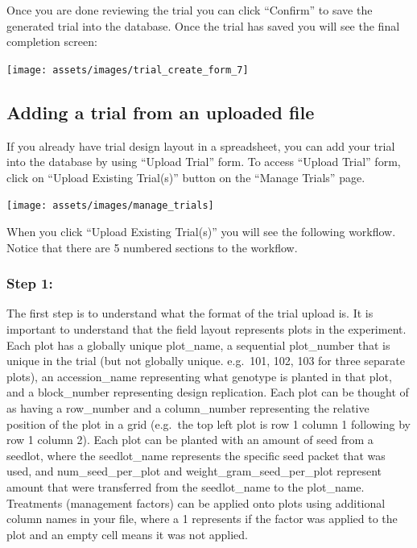 \documentclass[
  12pt,
]{book}
\begin{document}
Once you are done reviewing the trial you can click ``Confirm'' to save the generated trial into the database. Once the trial has saved you will see the final completion screen:

\begin{center}\texttt{[image: assets/images/trial\_create\_form\_7]} \end{center}

\hypertarget{adding-a-trial-from-an-uploaded-file}{%
\subsection{Adding a trial from an uploaded file}\label{adding-a-trial-from-an-uploaded-file}}

If you already have trial design layout in a spreadsheet, you can add your trial into the database by using ``Upload Trial'' form. To access ``Upload Trial'' form, click on ``Upload Existing Trial(s)'' button on the ``Manage Trials'' page.

\begin{center}\texttt{[image: assets/images/manage\_trials]} \end{center}

When you click ``Upload Existing Trial(s)'' you will see the following workflow. Notice that there are 5 numbered sections to the workflow.

\hypertarget{step-1}{%
\subsubsection*{Step 1:}\label{step-1}}


The first step is to understand what the format of the trial upload is. It is important to understand that the field layout represents plots in the experiment. Each plot has a globally unique plot\_name, a sequential plot\_number that is unique in the trial (but not globally unique. e.g.~101, 102, 103 for three separate plots), an accession\_name representing what genotype is planted in that plot, and a block\_number representing design replication. Each plot can be thought of as having a row\_number and a column\_number representing the relative position of the plot in a grid (e.g.~the top left plot is row 1 column 1 following by row 1 column 2). Each plot can be planted with an amount of seed from a seedlot, where the seedlot\_name represents the specific seed packet that was used, and num\_seed\_per\_plot and weight\_gram\_seed\_per\_plot represent amount that were transferred from the seedlot\_name to the plot\_name. Treatments (management factors) can be applied onto plots using additional column names in your file, where a 1 represents if the factor was applied to the plot and an empty cell means it was not applied.
\end{document}
